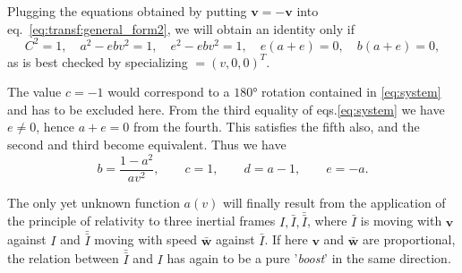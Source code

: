 Plugging the equations obtained by putting $ \mathbf{v} = -\mathbf{v} $ into eq.~\eqref{eq:transf:general_form2}, we will obtain an identity only if
\begin{equation}
C^2=1, \quad a^2-ebv^2=1,\quad e^2-ebv^2=1,\quad e(a+e)=0,\quad b(a+e)=0,
\label{eq:system}
\end{equation}
as is best checked by specializing $ \mathbf = (v, 0, 0)^T $.

The value $ c = -1 $ would correspond to a $ 180° $ rotation contained in \eqref{eq:system} and has to be excluded here. From the third equality of eqs.\eqref{eq:system} we have $ e\neq 0 $, hence $ a + e = 0 $ from the fourth. This satisfies the fifth also, and the second and third become equivalent. Thus we have 
\begin{equation}
b=\frac{1-a^2}{av^2}, \qquad c=1,\qquad d=a-1, \qquad e=-a.
\end{equation}

The only yet unknown function $ a( v) $ will finally result from the application of the principle of relativity to three inertial frames $ I, \bar{I}, \bar{\bar{I}} $, where $ \bar{I} $ is moving with $ \mathbf{v} $ against $ I $ and $ \bar{\bar{I}} $ moving with speed $ \mathbf{\bar{w}} $ against $ \bar{I} $. If here $ \mathbf{v} $ and $ \mathbf{\bar{w}} $ are proportional, the relation
between $ \bar{\bar{I}} $ and $ I $ has again to be a pure '\emph{boost}' in the same direction.

